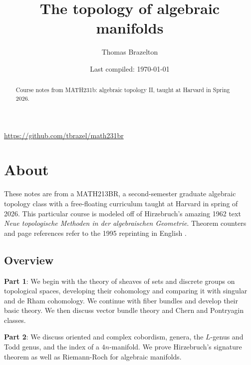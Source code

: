 \documentclass[11pt]{amsart}
\title{The topology of algebraic manifolds}
\author{Thomas Brazelton}
\date{Last compiled: \today}
\begin{document}
\begin{abstract}
Course notes from MATH231b: algebraic topology II, taught at Harvard in Spring 2026.
\end{abstract}

\maketitle

\begin{center}
    \url{https://github.com/tbrazel/math231br}
\end{center}


\setcounter{section}{-1}
\section{About}

These notes are from a MATH213BR, a second-semester graduate algebraic topology class with a free-floating curriculum taught at Harvard in spring of 2026. This particular course is modeled off of Hirzebruch's amazing 1962 text \emph{Neue topologische Methoden in der algebraischen Geometrie}. Theorem counters and page references refer to the 1995 reprinting in English \cite{Hirzebruch}.

\subsection{Overview}

\textbf{Part 1}: We begin with the theory of sheaves of sets and discrete groups on topological spaces, developing their cohomology and comparing it with singular and de Rham cohomology. We continue with fiber bundles and develop their basic theory. We then discuss vector bundle theory and Chern and Pontryagin classes. 

\textbf{Part 2}: We discuss oriented and complex cobordism, genera, the $L$-genus and Todd genus, and the index of a $4n$-manifold. We prove Hirzebruch's signature theorem as well as Riemann-Roch for algebraic manifolds.

\setcounter{tocdepth}{1}
\tableofcontents{}
\end{document}
